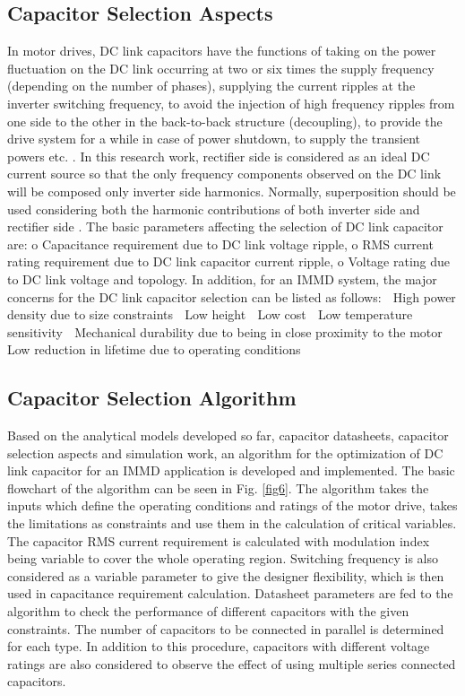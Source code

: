 \documentclass[conference,a4paper,twocolumn]{IEEEtran}
\begin{document}
\subsection{Capacitor Selection Aspects}

In motor drives, DC link capacitors have the functions of taking on the power fluctuation on the DC link occurring at two or six times the supply frequency (depending on the number of phases), supplying the current ripples at the inverter switching frequency, to avoid the injection of high frequency ripples from one side to the other in the back-to-back structure (decoupling), to provide the drive system for a while in case of power shutdown, to supply the transient powers etc. \cite{Bianchi2003}. In this research work, rectifier side is considered as an ideal DC current source so that the only frequency components observed on the DC link will be composed only inverter side harmonics. Normally, superposition should be used considering both the harmonic contributions of both inverter side and rectifier side \cite{Bianchi2003}.
The basic parameters affecting the selection of DC link capacitor are:
o	Capacitance requirement due to DC link voltage ripple,
o	RMS current rating requirement due to DC link capacitor current ripple,
o	Voltage rating due to DC link voltage and topology.
In addition, for an IMMD system, the major concerns for the DC link capacitor selection can be listed as follows:
	High power density due to size constraints
	Low height
	Low cost
	Low temperature sensitivity
	Mechanical durability due to being in close proximity to the motor
	Low reduction in lifetime due to operating conditions



\subsection{Capacitor Selection Algorithm}

Based on the analytical models developed so far, capacitor datasheets, capacitor selection aspects and simulation work, an algorithm for the optimization of DC link capacitor for an IMMD application is developed and implemented. The basic flowchart of the algorithm can be seen in Fig. \ref{fig6}. The algorithm takes the inputs which define the operating conditions and ratings of the motor drive, takes the limitations as constraints and use them in the calculation of critical variables. The capacitor RMS current requirement is calculated with modulation index being variable to cover the whole operating region. Switching frequency is also considered as a variable parameter to give the designer flexibility, which is then used in capacitance requirement calculation. Datasheet parameters are fed to the algorithm to check the performance of different capacitors with the given constraints. The number of capacitors to be connected in parallel is determined for each type. In addition to this procedure, capacitors with different voltage ratings are also considered to observe the effect of using multiple series connected capacitors.
\end{document}
